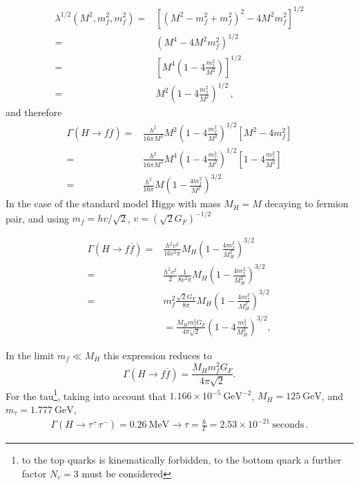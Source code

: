 \begin{frame}
\begin{align}
  \lambda^{1/2}(M^2,m^2_f,m_f^2)=&
  \left[ \left( M^2-m^2_f+m^2_f  \right)^2-4 M^2m_f^2  \right]^{1/2}\nonumber\\
  =&\left( M^4-4 M^2m_f^2  \right)^{1/2}\nonumber\\
  =&\left[M^4 \left( 1-4 \frac{m_f^2}{M^2} \right) \right]^{1/2}\nonumber\\
  =&M^2 \left( 1-4 \frac{m_f^2}{M^2} \right)^{1/2}\,,
\end{align}
and therefore
\begin{align}
\Gamma(H\to f\overline{f})=&\frac{h^2}{16 \pi M^3}M^2 \left( 1-4 \frac{m_f^2}{M^2} \right)^{1/2}
 \left[M^2-4m_f^2\right] \nonumber\\
=&\frac{h^2}{16 \pi M^3}M^4 \left( 1-4 \frac{m_f^2}{M^2} \right)^{1/2}
 \left[1-4 \frac{m_f^2}{M^2}\right] \nonumber\\
=&\frac{h^2}{16 \pi}M\left(1-\frac{4m_f^2}{M^2}\right)^{3/2}
\end{align}
In the case of the standard model Higgs with mass $M_H=M$ decaying to fermion pair, and using $m_f=hv/\sqrt{2}$,  $v=\left( \sqrt{2}G_F \right)^{-1/2}$

\begin{align}
\Gamma(H\to f\overline{f})=&\frac{h^2v^2}{16 v^2 \pi}M_H\left(1-\frac{4m_f^2}{M_H^2}\right)^{3/2} \nonumber\\
=&\frac{h^2v^2}{2}\frac{1}{8 v^2 \pi}M_H\left(1-\frac{4m_f^2}{M_H^2}\right)^{3/2} \nonumber\\
=&m_f^2\frac{\sqrt{2}G_F}{8\pi}M_H\left(1-\frac{4m_f^2}{M_H^2}\right)^{3/2} \nonumber\\
&=\frac{M_{H}m_{f}^{2}G_{F}}{4\pi\sqrt{2}}
\left(1-4\frac{m^2_{f}}{M^2_{H}}\right)^{3/2}, 
\end{align}

In the limit $m_{f}\ll M_{H}$ this expression reduces to 
\begin{equation}
\Gamma(H\to
f\overline{f})=\frac{M_{H}m_{f}^{2}G_{F}}{4\pi\sqrt{2}}. 
\end{equation}
For the tau\footnote{to the top quarks is kinematically forbidden, to the bottom quark a further factor $N_c=3$ must be considered}, taking into account that $1.166 \times 10^{-5}\ \text{GeV}^{-2}$, $M_H=125\ \text{GeV}$, and $m_\tau=1.777\ \text{GeV}$,
\begin{align}
  \Gamma(H\to \tau^+\tau^-)=0.26\ \text{MeV}\to \tau= \frac{\hbar}{\Gamma}=2.53\times 10^{-21}\ \text{seconds}\,.
\end{align}
\end{frame}



